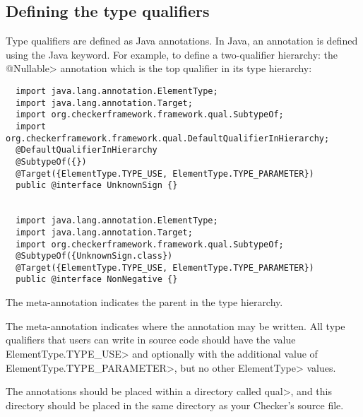 \subsection{Defining the type qualifiers\label{define-type-qualifiers}}


Type qualifiers are defined as Java annotations.  In Java, an
annotation is defined using the Java  keyword.
For example, to define a two-qualifier hierarchy: the \<@Nullable> annotation which is the top
qualifier in its type hierarchy:

\begin{Verbatim}
  import java.lang.annotation.ElementType;
  import java.lang.annotation.Target;
  import org.checkerframework.framework.qual.SubtypeOf;
  import org.checkerframework.framework.qual.DefaultQualifierInHierarchy;
  @DefaultQualifierInHierarchy
  @SubtypeOf({})
  @Target({ElementType.TYPE_USE, ElementType.TYPE_PARAMETER})
  public @interface UnknownSign {}


  import java.lang.annotation.ElementType;
  import java.lang.annotation.Target;
  import org.checkerframework.framework.qual.SubtypeOf;
  @SubtypeOf({UnknownSign.class})
  @Target({ElementType.TYPE_USE, ElementType.TYPE_PARAMETER})
  public @interface NonNegative {}
\end{Verbatim}

The  meta-annotation
indicates the parent in the type hierarchy.

The 
meta-annotation indicates where the annotation
may be written. All type qualifiers that users can write in source code should
have the value \<ElementType.TYPE\_USE> and optionally with the additional value
of \<ElementType.TYPE\_PARAMETER>, but no other \<ElementType> values.

The annotations should be placed within a directory called \<qual>, and this
directory should be placed in the same directory as your Checker's source file.

